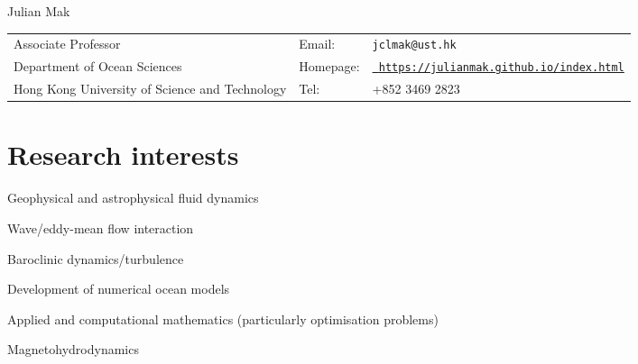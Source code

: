 \documentclass[letterpaper]{article}
\def\name{Julian Mak}
\renewenvironment{itemize}{
  \begin{list}{}{
    \setlength{\leftmargin}{1.5em}
  }
}{
  \end{list}
}
\begin{document}
{\huge \name}


\vspace{0.25in}
\begin{tabular}{lll}
  Associate Professor & Email: & {\tt jclmak@ust.hk} \\
  Department of Ocean Sciences & Homepage: & \href{https://julianmak.github.io/index.html}{\tt
https://julianmak.github.io/index.html} \\
  Hong Kong University of Science and Technology & Tel: & +852 3469 2823
\end{tabular}
\section*{Research interests}
\begin{itemize}
\item Geophysical and astrophysical fluid dynamics
\begin{itemize}
	\item[--] Wave/eddy-mean flow interaction
	\item[--] Baroclinic dynamics/turbulence
	\item[--] Development of numerical ocean models
	\item[--] Applied and computational mathematics (particularly optimisation problems)
	\item[--] Magnetohydrodynamics
\end{itemize}
\end{itemize}
\end{document}
